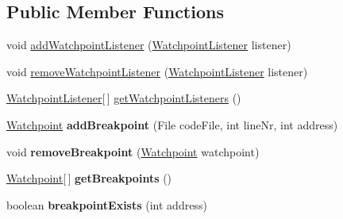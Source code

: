 \subsection*{Public Member Functions}
\begin{DoxyCompactItemize}
\item 
void \hyperlink{interfaceorg_1_1contikios_1_1cooja_1_1WatchpointMote_a422ed917d13f2e76099cec13cea7be4c}{add\-Watchpoint\-Listener} (\hyperlink{interfaceorg_1_1contikios_1_1cooja_1_1WatchpointMote_1_1WatchpointListener}{Watchpoint\-Listener} listener)
\item 
void \hyperlink{interfaceorg_1_1contikios_1_1cooja_1_1WatchpointMote_a57ad0caf798fd458fef468f40977b9f0}{remove\-Watchpoint\-Listener} (\hyperlink{interfaceorg_1_1contikios_1_1cooja_1_1WatchpointMote_1_1WatchpointListener}{Watchpoint\-Listener} listener)
\item 
\hyperlink{interfaceorg_1_1contikios_1_1cooja_1_1WatchpointMote_1_1WatchpointListener}{Watchpoint\-Listener}\mbox{[}$\,$\mbox{]} \hyperlink{interfaceorg_1_1contikios_1_1cooja_1_1WatchpointMote_abce6d5e098f44df1a6991cdd3f0b4afa}{get\-Watchpoint\-Listeners} ()
\item 
\hypertarget{interfaceorg_1_1contikios_1_1cooja_1_1WatchpointMote_add650fce714a1f156c06defc0a1d9057}{\hyperlink{interfaceorg_1_1contikios_1_1cooja_1_1Watchpoint}{Watchpoint} {\bfseries add\-Breakpoint} (File code\-File, int line\-Nr, int address)}\label{interfaceorg_1_1contikios_1_1cooja_1_1WatchpointMote_add650fce714a1f156c06defc0a1d9057}

\item 
\hypertarget{interfaceorg_1_1contikios_1_1cooja_1_1WatchpointMote_a0621db6f7fd4b2afa17e8e550973564d}{void {\bfseries remove\-Breakpoint} (\hyperlink{interfaceorg_1_1contikios_1_1cooja_1_1Watchpoint}{Watchpoint} watchpoint)}\label{interfaceorg_1_1contikios_1_1cooja_1_1WatchpointMote_a0621db6f7fd4b2afa17e8e550973564d}

\item 
\hypertarget{interfaceorg_1_1contikios_1_1cooja_1_1WatchpointMote_aef2586e726f86f2cd99ae6789cc2c516}{\hyperlink{interfaceorg_1_1contikios_1_1cooja_1_1Watchpoint}{Watchpoint}\mbox{[}$\,$\mbox{]} {\bfseries get\-Breakpoints} ()}\label{interfaceorg_1_1contikios_1_1cooja_1_1WatchpointMote_aef2586e726f86f2cd99ae6789cc2c516}

\item 
\hypertarget{interfaceorg_1_1contikios_1_1cooja_1_1WatchpointMote_ac70a8cf1a7b58e3adb5d9d4586ad6e65}{boolean {\bfseries breakpoint\-Exists} (int address)}\label{interfaceorg_1_1contikios_1_1cooja_1_1WatchpointMote_ac70a8cf1a7b58e3adb5d9d4586ad6e65}


\end{DoxyCompactItemize}
